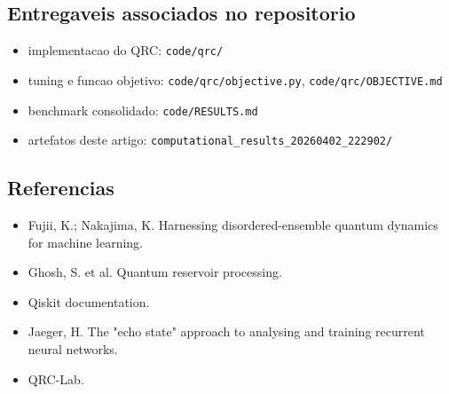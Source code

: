 \documentclass[12pt]{article}
\providecommand{\tightlist}{%
          \setlength{\itemsep}{0pt}\setlength{\parskip}{0pt}}
\begin{document}
\subsection{Entregaveis associados no repositorio}\label{entregaveis-associados-no-repositorio}

\begin{itemize}
\tightlist
\item
  implementacao do QRC: \texttt{code/qrc/}
\item
  tuning e funcao objetivo: \texttt{code/qrc/objective.py}, \texttt{code/qrc/OBJECTIVE.md}
\item
  benchmark consolidado: \texttt{code/RESULTS.md}
\item
  artefatos deste artigo: \texttt{computational\_results\_20260402\_222902/}
\end{itemize}

\subsection{Referencias}\label{referencias}

\begin{itemize}
\tightlist
\item
  Fujii, K.; Nakajima, K. Harnessing disordered-ensemble quantum dynamics for machine learning.
\item
  Ghosh, S. et al. Quantum reservoir processing.
\item
  Qiskit documentation.
\item
  Jaeger, H. The "echo state" approach to analysing and training recurrent neural networks.
\item
  QRC-Lab.
\end{itemize}

        
\end{document}
